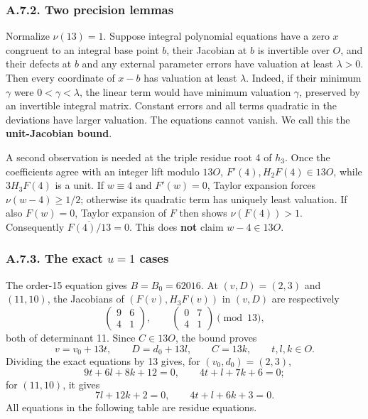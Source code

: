 \documentclass[
  british,
  10pt,
  a4paper,
]{article}
\begin{document}
\subsubsection*{A.7.2. Two precision
lemmas}\label{a.7.2.-two-precision-lemmas}

Normalize \(\nu(13)=1\). Suppose integral polynomial equations have a
zero \(x\) congruent to an integral base point \(b\), their Jacobian at
\(b\) is invertible over \(O\), and their defects at \(b\) and any
external parameter errors have valuation at least \(\lambda>0\). Then
every coordinate of \(x-b\) has valuation at least \(\lambda\). Indeed,
if their minimum \(\gamma\) were \(0<\gamma<\lambda\), the linear term
would have minimum valuation \(\gamma\), preserved by an invertible
integral matrix. Constant errors and all terms quadratic in the
deviations have larger valuation. The equations cannot vanish. We call
this the \textbf{unit-Jacobian bound}.

A second observation is needed at the triple residue root 4 of \(h_3\).
Once the coefficients agree with an integer lift modulo \(13O\),
\(F'(4),H_2F(4)\in13O\), while \(3H_3F(4)\) is a unit. If \(w\equiv4\)
and \(F'(w)=0\), Taylor expansion forces \(\nu(w-4)\ge1/2\); otherwise
its quadratic term has uniquely least valuation. If also \(F(w)=0\),
Taylor expansion of \(F\) then shows \(\nu(F(4))>1\). Consequently
\(\overline{F(4)/13}=0\). This does \textbf{not} claim \(w-4\in13O\).

\subsubsection*{\texorpdfstring{A.7.3. The exact \(u=1\)
cases}{A.7.3. The exact u=1 cases}}\label{a.7.3.-the-exact-u1-cases}

The order-15 equation gives \(B=B_0=62016\). At \((v,D)=(2,3)\) and
\((11,10)\), the Jacobians of \((F(v),H_3F(v))\) in \((v,D)\) are
respectively \[
\begin{pmatrix}9&6\\4&1\end{pmatrix},\qquad
\begin{pmatrix}0&7\\4&1\end{pmatrix}
\pmod{13},
\] both of determinant 11. Since \(C\in13O\), the bound proves \[
v=v_0+13t,\qquad D=d_0+13l,\qquad C=13k,\qquad t,l,k\in O.
\] Dividing the exact equations by 13 gives, for \((v_0,d_0)=(2,3)\), \[
9t+6l+8k+12=0,\qquad 4t+l+7k+6=0;
\tag{S18}
\] for \((11,10)\), it gives \[
7l+12k+2=0,\qquad 4t+l+6k+3=0.
\tag{S19}
\] All equations in the following table are residue equations.
\end{document}
